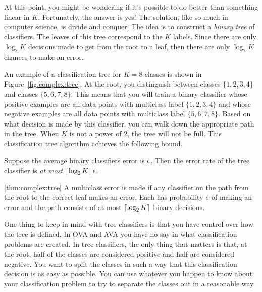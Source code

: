 
At this point, you might be wondering if it's possible to do better
than something linear in $K$.  Fortunately, the answer is yes!  The
solution, like so much in computer science, is divide and conquer.
The idea is to construct a \emph{binary tree} of classifiers.  The
leaves of this tree correspond to the $K$ labels.  Since there are
only $\log_2 K$ decisions made to get from the root to a leaf, then
there are only $\log_2 K$ chances to make an error.


An example of a classification tree for $K=8$ classes is shown in
Figure~\ref{fig:complex:tree}.  At the root, you distinguish between
classes $\{1,2,3,4\}$ and classes $\{5,6,7,8\}$.  This means that you
will train a binary classifier whose positive examples are all data
points with multiclass label $\{1,2,3,4\}$ and whose negative examples
are all data points with multiclass label $\{5,6,7,8\}$.  Based on
what decision is made by this classifier, you can walk down the
appropriate path in the tree.  When $K$ is not a power of $2$, the
tree will not be full.  This classification tree algorithm achieves
the following bound.

\begin{theorem} \label{thm:complex:tree} Suppose the
  average binary classifiers error is $\epsilon$.  Then the error rate of
  the tree classifier is \emph{at most} $\left\lceil{\log_2 K}\right\rceil \epsilon$.
\end{theorem}
\begin{myproof}{\ref{thm:complex:tree}}
  A multiclass error is made if any classifier on the path from the
  root to the correct leaf makes an error.  Each has probability $\epsilon$
  of making an error and the path consists of at most $\left\lceil{\log_2
    K}\right\rceil$ binary decisions.
\end{myproof}

One thing to keep in mind with tree classifiers is that you have
control over how the tree is defined.  In OVA and AVA you have no say
in what classification problems are created.  In tree classifiers, the
only thing that matters is that, at the root, half of the classes are
considered positive and half are considered negative.  You want to
split the classes in such a way that this classification decision is
as easy as possible.  You can use whatever you happen to know about
your classification problem to try to separate the classes out in a
reasonable way.

